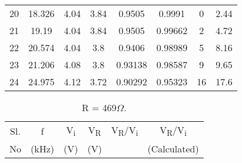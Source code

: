 \documentclass[a4paper]{article}
\begin{document}
\begin{table}[H]
\begin{center}
{\begin{tabular}{|c|c|c|c|c|c|c|c|}
20 & 18.326 & 4.04 & 3.84 & 0.9505  & 0.9991  & 0   & 2.44   \\
21 & 19.19  & 4.04 & 3.84 & 0.9505  & 0.99662 & 2   & 4.72   \\
22 & 20.574 & 4.04 & 3.8  & 0.9406  & 0.98989 & 5   & 8.16   \\
23 & 21.206 & 4.08 & 3.8  & 0.93138 & 0.98587 & 9   & 9.65   \\
24 & 24.975 & 4.12 & 3.72 & 0.90292 & 0.95323 & 16  & 17.6   \\
\hline
\end{tabular}
    }
  \end{center}
\end{table}



\begin{table}[H]
  \begin{center}
    \caption{R = 469$\Omega$.}
    \label{tab:table1}
\resizebox{8cm}{!} {
   \begin{tabular}{|c|c|c|c|c|c|}
   \hline
Sl. & f & V\textsubscript{\tiny i} & V\textsubscript{\tiny R} &  V\textsubscript{\tiny R}/V\textsubscript{\tiny i} & V\textsubscript{\tiny R}/V\textsubscript{\tiny i} \\
No & (kHz) & (V) &(V) &  & (Calculated)  \\


\end{tabular}}
\end{center}
\end{table}
\end{document}
